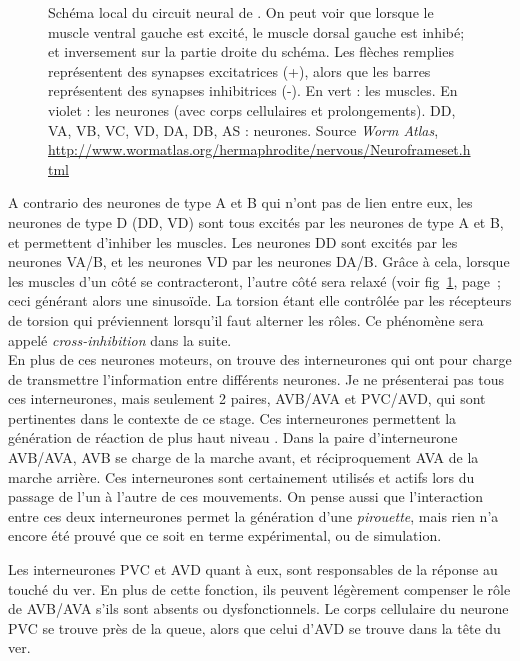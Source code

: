 \begin{figure}[ht]
   \begin{center}
   \end{center}
   \caption[Schéma local du circuit neural de \celeg{}]{Schéma local du circuit neural de \celeg{}. On peut voir
   que lorsque le muscle ventral gauche est excité, le muscle dorsal gauche est
   inhibé; et inversement sur la partie droite du schéma. Les flèches remplies
   représentent des synapses excitatrices (+), alors que les barres représentent des
   synapses inhibitrices (-). En vert : les muscles. En violet : les neurones (avec corps cellulaires et prolongements).
   DD, VA, VB, VC, VD, DA, DB, AS : neurones. Source \textit{Worm Atlas}\cite{AltunZ.F.andHall2011},
   \url{http://www.wormatlas.org/hermaphrodite/nervous/Neuroframeset.html}}
   \label{fig:alternance_dv}
\end{figure}

A contrario des neurones de type A et B qui n'ont pas de lien entre eux, les
neurones de type D (DD, VD) sont tous excités par les neurones de type A et B,
et permettent d'inhiber les muscles. Les neurones DD sont excités par les
neurones VA/B, et les neurones VD par les neurones DA/B. Grâce à cela, lorsque
les muscles d'un côté se contracteront, l'autre côté sera relaxé (voir
fig~\ref{fig:alternance_dv}, page~\pageref{fig:alternance_dv}; ceci générant
alors une sinusoïde. La torsion étant elle contrôlée par les récepteurs de
torsion qui préviennent lorsqu'il faut alterner les rôles. Ce phénomène sera
appelé \textit{cross-inhibition} dans la suite.\\


En plus de ces neurones moteurs, on trouve des interneurones qui ont pour
charge de transmettre l'information entre différents neurones. Je ne
présenterai pas tous ces interneurones, mais seulement 2 paires, AVB/AVA et
PVC/AVD, qui sont pertinentes dans le contexte de ce stage. Ces interneurones
permettent la génération de réaction de plus haut niveau
\cite{Boyle2009,White1986}.  Dans la paire d'interneurone AVB/AVA, AVB se charge de 
la marche avant, et réciproquement AVA de la marche arrière. Ces
interneurones sont certainement utilisés et actifs lors du passage de l'un à
l'autre de ces mouvements. On pense aussi que l'interaction entre ces deux
interneurones permet la génération d'une \textit{pirouette}, mais rien n'a
encore été prouvé que ce soit en terme expérimental, ou de simulation.

Les interneurones PVC et AVD quant à eux, sont responsables de la réponse au
touché du ver. En plus de cette fonction, ils peuvent légèrement compenser le
rôle de AVB/AVA s'ils sont absents ou dysfonctionnels. Le corps cellulaire du
neurone PVC se trouve près de la queue, alors que celui d'AVD se trouve dans la
tête du ver.

